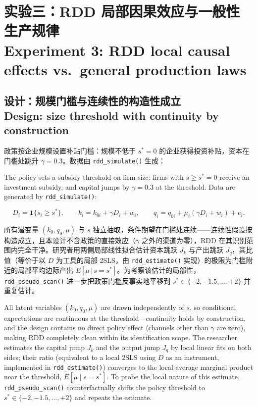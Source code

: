 \documentclass[12pt,a4paper]{ctexart}
\begin{document}
\section[实验三：RDD]{实验三：RDD 局部因果效应与一般性生产规律\\[2pt]\normalsize Experiment 3: RDD local causal effects vs.\ general production laws}

\subsection[设计]{设计：规模门槛与连续性的构造性成立\\[1pt]\normalsize Design: size threshold with continuity by construction}

政策按企业规模设置补贴门槛：规模不低于 $s^* = 0$ 的企业获得投资补贴，资本在门槛处跳升 $\gamma = 0.3$。数据由 \texttt{rdd\_simulate()} 生成：

The policy sets a subsidy threshold on firm size: firms with $s\ge s^*=0$ receive an investment subsidy, and capital jumps by $\gamma=0.3$ at the threshold. Data are generated by \texttt{rdd\_simulate()}:

\begin{equation}\label{eq:rdd}
D_i = \mathbf{1}\{s_i \ge s^*\}, \qquad
k_i = k_{0i} + \gamma D_i + w_i, \qquad
q_i = q_{0i} + \mu_i(\gamma D_i + w_i) + e_i .
\end{equation}

所有潜变量 $(k_0, q_0, \mu)$ 与 $s$ 独立抽取，条件期望在门槛处连续——连续性假设按构造成立，且本设计不含政策的直接效应（$\gamma$ 之外的渠道为零），RDD 在其识别范围内完全干净。研究者用两侧局部线性拟合估计资本跳跃 $J_k$ 与产出跳跃 $J_q$，其比值（等价于以 $D$ 为工具的局部 2SLS，由 \texttt{rdd\_estimate()} 实现）的极限为门槛附近的局部平均边际产出 $E[\mu\,|\,s = s^*]$。为考察该估计的局部性，\texttt{rdd\_pseudo\_scan()} 进一步把政策门槛反事实地平移到 $s^* \in \{-2, -1.5, \ldots, +2\}$ 并重复估计。

All latent variables $(k_0,q_0,\mu)$ are drawn independently of $s$, so conditional expectations are continuous at the threshold—continuity holds by construction, and the design contains no direct policy effect (channels other than $\gamma$ are zero), making RDD completely clean within its identification scope. The researcher estimates the capital jump $J_k$ and the output jump $J_q$ by local linear fits on both sides; their ratio (equivalent to a local 2SLS using $D$ as an instrument, implemented in \texttt{rdd\_estimate()}) converges to the local average marginal product near the threshold, $E[\mu\mid s=s^*]$. To probe the local nature of this estimate, \texttt{rdd\_pseudo\_scan()} counterfactually shifts the policy threshold to $s^*\in\{-2,-1.5,\ldots,+2\}$ and repeats the estimate.
\end{document}
